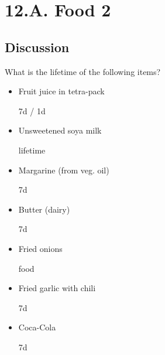 \chapter{12.A. Food 2}
\renewcommand*{\theChapterTitle}{12.A. Food 2}

\section*{Discussion}

What is the lifetime of the following items?

\bigskip

\begin{multicols}{2}

\begin{itemize}

\item Fruit juice in tetra-pack

\begin{solution}
  7d / 1d
\end{solution}

\item Unsweetened soya milk

\begin{solution}
  lifetime
\end{solution}

\item Margarine (from veg. oil)

\begin{solution}
  7d
\end{solution}

\item Butter (dairy)

\begin{solution}
  7d
\end{solution}

\item Fried onions

\begin{solution}
  food
\end{solution}

\item Fried garlic with chili

\begin{solution}
  7d
\end{solution}

\item Coca-Cola

\begin{solution}
  7d
\end{solution}


\end{itemize}
\end{multicols}

